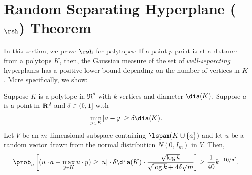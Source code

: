 \section{Random Separating Hyperplane ($\rsh$) Theorem}
\label{sec:rsh}
In this section, we prove $\rsh$ for polytopes: If a point $p$  point is at a distance from a polytope $K$, then, the Gaussian measure of the set of {\em well-separating} hyperplanes has a positive lower bound depending on the number of vertices in $K$. More specifically, we show:

\begin{theorem}
\label{thm:sephp}
Suppose $K$ is a polytope in $\Re^d$ with $k$ vertices and diameter $\dia(K)$. Suppose  $a$ is a point in ${\bf R}^d$ and $\delta\in (0,1]$ with
\begin{align}
\label{eq:condhp}
\min_{y\in K} |a-y|\geq\delta \dia(K).
\end{align}
Let $V$ be an $m$-dimensional subspace containing $\lspan(K\cup \{ a\})$ and let $u$ be a random vector drawn from the normal distribution $N(0, I_m)$ in $V$. 
Then,
$$\prob_u\left[ (u\cdot a-\max_{y\in K}u\cdot y) \geq  |u| \cdot \delta \dia(K) \cdot \frac{\sqrt{\log k}}{\sqrt{\log k} + 4 \delta \sqrt{m}} \right]\geq
            \frac{1}{40}    k^{-10/\delta^2}.$$
\end{theorem}          


